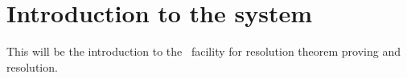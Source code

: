 \section{Introduction to the system}

This will be the introduction to the \keim\  facility for resolution theorem proving and resolution.

